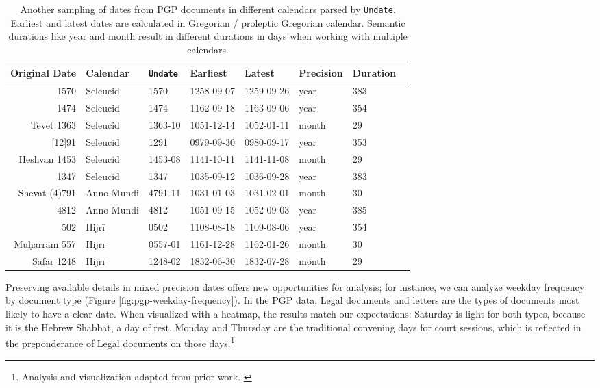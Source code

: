 \documentclass[final]{anthology-ch} %
\begin{document}
\begin{table}[h]
  \centering 
  \begin{tabular}{rlllllll}
    \toprule
Original Date & Calendar & \texttt{Undate} & Earliest & Latest & Precision & Duration \\ 
\midrule
1570 & Seleucid & 1570 & 1258-09-07 & 1259-09-26 & year & 383 \\
1474 & Seleucid & 1474 & 1162-09-18 & 1163-09-06 & year & 354 \\
Tevet 1363 & Seleucid & 1363-10 & 1051-12-14 & 1052-01-11 & month & 29 \\
{[12]91} & Seleucid & 1291 & 0979-09-30 & 0980-09-17 & year & 353 \\
Heshvan 1453 & Seleucid & 1453-08 & 1141-10-11 & 1141-11-08 & month & 29 \\
1347 & Seleucid & 1347 & 1035-09-12 & 1036-09-28 & year &  383 \\
\midrule
Shevat (4)791 & Anno Mundi & 4791-11 & 1031-01-03 & 1031-02-01 & month & 30 \\
4812 & Anno Mundi & 4812 & 1051-09-15 & 1052-09-03 & year & 385 \\
\midrule
502 & Hijrī & 0502 & 1108-08-18 & 1109-08-06 & year & 354 \\
Muḥarram 557 & Hijrī & 0557-01 & 1161-12-28 & 1162-01-26 & month & 30 \\
Safar 1248 & Hijrī & 1248-02 & 1832-06-30 & 1832-07-28 & month & 29 \\
\bottomrule
    \bottomrule
  \end{tabular}
  \caption{Another sampling of dates from PGP documents in different calendars parsed by \texttt{Undate}. Earliest and latest dates are calculated in Gregorian / proleptic Gregorian calendar. Semantic durations like year and month result in different durations in days when working with multiple calendars.}
  \label{tab:pgp-date-durations}
\end{table}



Preserving available details in mixed precision dates offers new opportunities for analysis; for instance, we can analyze weekday frequency by document type (Figure \ref{fig:pgp-weekday-frequency}). In the PGP data, Legal documents and letters are the types of documents most likely to have a clear date. When visualized with a heatmap, the results match our expectations: Saturday is light for both types, because it is the Hebrew Shabbat, a day of rest. Monday and Thursday are the traditional convening days for court sessions, which is reflected in the preponderance of Legal documents on those days.\footnote{Analysis and visualization adapted from prior work. \cite{koeser_undate_2025}}
\end{document}

